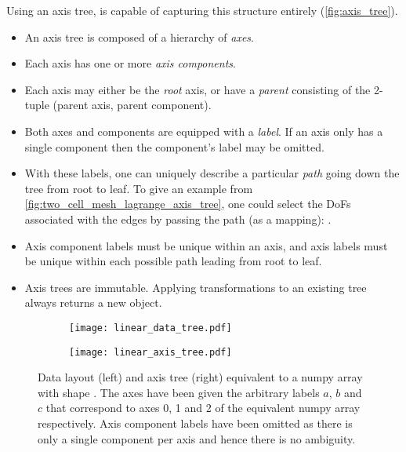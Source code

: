 \documentclass[thesis]{subfiles}
\begin{document}
Using an axis tree,  is capable of capturing this structure entirely (\cref{fig:axis_tree}).

\begin{itemize}
  \item
    An axis tree is composed of a hierarchy of \textit{axes}.

  \item
    Each axis has one or more \textit{axis components}.

  \item
    Each axis may either be the \textit{root} axis, or have a \textit{parent} consisting of the 2-tuple (parent axis, parent component).

  \item
    Both axes and components are equipped with a \textit{label}.
    If an axis only has a single component then the component's label may be omitted.

  \item
    With these labels, one can uniquely describe a particular \textit{path} going down the tree from root to leaf.
    To give an example from \cref{fig:two_cell_mesh_lagrange_axis_tree}, one could select the DoFs associated with the edges by passing the path (as a mapping): .

  \item
    Axis component labels must be unique within an axis, and axis labels must be unique within each possible path leading from root to leaf.

  \item
    Axis trees are immutable. Applying transformations to an existing tree always returns a new object.
\end{itemize}

\begin{figure}
  \centering
  \begin{subfigure}{.49\textwidth}
    \centering
    \texttt{[image: linear\_data\_tree.pdf]}
  \end{subfigure}
  \begin{subfigure}{.49\textwidth}
    \centering
    \texttt{[image: linear\_axis\_tree.pdf]}
  \end{subfigure}
  \caption{
    Data layout (left) and axis tree (right) equivalent to a numpy array with shape .
    The axes have been given the arbitrary labels $a$, $b$ and $c$ that correspond to axes 0, 1 and 2 of the equivalent numpy array respectively.
    Axis component labels have been omitted as there is only a single component per axis and hence there is no ambiguity.
  }
  \label{fig:numpy_axis_tree}
\end{figure}
\end{document}
